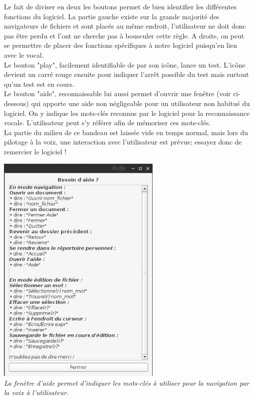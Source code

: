 \documentclass[a4paper, 11pt]{report}
\begin{document}
	Le fait de diviser en deux les boutons permet de bien identifier les différentes fonctions du logiciel. La partie gauche existe sur la grande majorité des navigateurs de fichiers et sont placés au même endroit, l'utilisateur ne doit donc pas être perdu et l'ont ne cherche pas à bousculer cette règle. A droite, on peut se permettre de placer des fonctions spécifiques à notre logiciel puisqu'en lien avec le vocal.\\
	Le bouton "play", facilement identifiable de par son icône, lance un test. L'icône devient un carré rouge ensuite pour indiquer l'arrêt possible du test mais surtout qu'un test est en cours.\\
	Le bouton "aide", reconnaissable lui aussi permet d'ouvrir une fenêtre (voir ci-dessous) qui apporte une aide non négligeable pour un utilisateur non habitué du logiciel. On y indique les mots-clés reconnus par le logiciel pour la reconnaissance vocale. L'utilisateur peut s'y référer afin de mémoriser ces mots-clés.\\
	La partie du milieu de ce bandeau est laissée vide en temps normal, mais lors du pilotage à la voix, une interaction avec l'utilisateur est prévue; essayez donc de remercier le logiciel !
	
	\begin{center}
		\includegraphics[width=8cm]{help}\\
		\emph{La fenêtre d'aide permet d'indiquer les mots-clés à utiliser pour la navigation par la voix à l'utilisateur.\\}
	\end{center}
	
\end{document}
